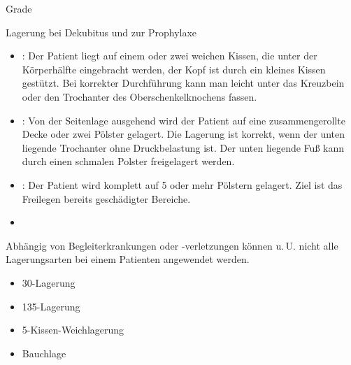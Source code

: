 \Text
{Grade}
{}
{}
{}
{}
{}

\TextSlide
{Lagerung bei Dekubitus und zur Prophylaxe}
{
\begin{itemize}
  \item {}: Der Patient liegt auf
  einem oder zwei weichen Kissen, die unter der Körperhälfte
  eingebracht werden, der Kopf ist durch ein kleines Kissen
  gestützt. Bei korrekter Durchführung kann man leicht unter
  das Kreuzbein oder den Trochanter des Oberschenkelknochens
  fassen. \cite{ThiemesPflege12}
  \item {}: 
  Von der Seitenlage ausgehend wird der Patient auf eine
  zusammengerollte Decke oder zwei Pölster gelagert. Die
  Lagerung ist korrekt, wenn der unten liegende Trochanter
  ohne Druckbelastung ist. Der unten liegende Fuß kann
  durch einen schmalen Polster freigelagert werden.
  \cite{WundversorgungPflege2}
  
  \item {}: Der Patient wird komplett
  auf 5 oder mehr Pölstern gelagert. Ziel ist das Freilegen
  bereits geschädigter Bereiche. \cite{ThiemesPflege12}
  \item {}
\end{itemize}
Abhängig von Begleiterkrankungen oder -verletzungen können
u.\,U. nicht alle Lagerungsarten bei einem Patienten
angewendet werden.
}
{
\begin{itemize}
  \item {30\textdegree{}-Lagerung}
  \item {135\textdegree{}-Lagerung}
  \item {5-Kissen-Weichlagerung}
  \item {Bauchlage}
\end{itemize}

 }
{}
{}
{}

